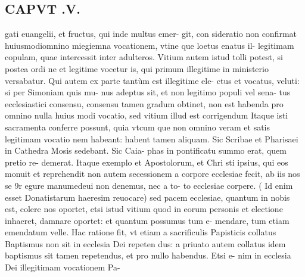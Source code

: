 \documentclass{article}
\begin{document}
\begin{pages}
\section*{CAPVT .V. }
\marginpar{[ p.365 ]}\pstart gati euangelii, et fructus, qui inde multus emer- git, con sideratio non confirmat huiusmodiomnino miegiemna vocationem, vtine que loetus enatus il- legitimam copulam, quae intercessit inter adulteros.  \pend\pstart Vitium autem istud tolli potest, si postea ordi ne et legitime vocetur is, qui primum illegitime in ministerio versabatur.  \pend\pstart Qui autem ex parte tantùm est illegitime ele- ctus et vocatus, veluti: si per Simoniam quis mu- nus adeptus sit, et non legitimo populi vel sena- tus ecclesiastici consensu, consensu tamen gradum obtinet, non est habenda pro omnino nulla huius modi vocatio, sed vitium illud est corrigendum Itaque isti sacramenta conferre possunt, quia vtcum que non omnino veram et satis legitimam vocatio nem habeant: habent tamen aliquam. Sic Scribae et Pharisaei in Cathedra Mosis sedebant. Sic Caia- phas in pontificatu summo erat, quem pretio re- demerat. Itaque exemplo et Apostolorum, et Chri sti ipsius, qui eos monuit et reprehendit non autem secessionem a corpore ecclesiae fecit, ab iis nos se 9r egure manumedeui non denemus, nec a to- to ecclesiae corpere. ( Id enim esset Donatistarum haeresim reuocare) sed pacem ecclesiae, quantum in nobis est, colere nos oportet, etsi istud vitium quod in eorum personis et electione inhaeret, damnare oportet: et quantum possumus tum e- mendare, tum etiam emendatum velle.  \pend\pstart Hac ratione fit, vt etiam a sacrificulis Papisticis collatus Baptismus non sit in ecclesia Dei repeten dus: a priuato autem collatus idem baptismus sit tamen repetendus, et pro nullo habendus. Etsi e- nim in ecclesia Dei illegitimam vocationem Pa-  \pend

\end{pages}
\end{document}
